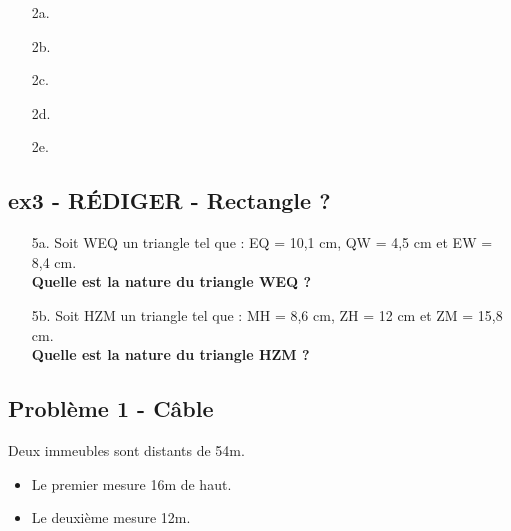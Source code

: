 \documentclass[12pt]{article}
\begin{document}
\begin{multicols}{5}
\begin{enumerate}
\item[2a.] \dotfill 
\item[2b.] \dotfill
\item[2c.] \dotfill 
\item[2d.] \dotfill 
\item[2e.] \dotfill 
\end{enumerate}
\end{multicols}
\begin{multicols}{5}
\begin{enumerate}
\item[] \dotfill 
\item[] \dotfill
\item[] \dotfill 
\item[] \dotfill 
\item[] \dotfill 
\end{enumerate}
\end{multicols}

\subsection*{ex3 - \textbf{RÉDIGER} - Rectangle ?}

\begin{enumerate}
  \item[5a.]Soit WEQ un triangle tel que : EQ = 10,1 cm, QW = 4,5 cm et EW = 8,4 cm.\\
  \textbf{Quelle est la nature du triangle WEQ ?} \\ \Pointilles[4]

  \item[5b.]Soit HZM un triangle tel que : MH = 8,6 cm, ZH = 12 cm et ZM = 15,8 cm. \\
  \textbf{Quelle est la nature du triangle HZM ?} \\ \Pointilles[4]
\end{enumerate}

\newpage


\subsection*{Problème 1 - Câble}

Deux immeubles sont distants de 54m. 
  \begin{itemize}
  \item Le premier mesure 16m de haut.
  \item Le deuxième mesure 12m. 
  \end{itemize}
\end{document}
